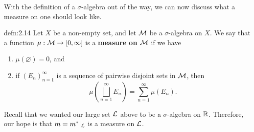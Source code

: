With the definition of a $\sigma$-algebra out of the way, we can now
discuss what a measure on one should look like. 

\begin{defn}{defn:2.14}
    Let $X$ be a non-empty set, and let ${\cal M}$ be a $\sigma$-algebra on $X$. 
    We say that a function $\mu : {\cal M} \to [0, \infty]$ is a 
    {\bf measure on ${\cal M}$} if we have 
    \begin{enumerate}
        \item $\mu(\varnothing) = 0$, and 
        \item if $(E_n)_{n=1}^\infty$ is a sequence of pairwise disjoint sets
        in ${\cal M}$, then 
        \[ \mu\!\left( \bigsqcup_{n=1}^\infty E_n \right) = \sum_{n=1}^\infty 
        \mu(E_n). \] 
    \end{enumerate}
\end{defn}

Recall that we wanted our large set ${\cal L}$ above to be a $\sigma$-algebra
on $\mathbb{R}$. Therefore, our hope is that $m = m^*|_{\cal L}$ is a measure on ${\cal L}$.
